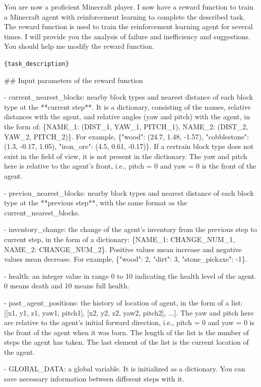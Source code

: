 

You are now a proficient Minecraft player. I now have a reward function to train a Minecraft agent with reinforcement learning to complete the described task. The reward function is used to train the reinforcement learning agent for several times. I will provide you the analysis of failure and inefficiency and suggestions. You should help me modify the reward function.



\texttt{\{task\_description\}}



\#\# Input parameters of the reward function

- current\_nearest\_blocks: nearby block types and nearest distance of each block type at the **current step**. It is a dictionary, consisting of the names, relative distances with the agent, and relative angles (yaw and pitch) with the agent, in the form of: \{NAME\_1: (DIST\_1, YAW\_1, PITCH\_1), NAME\_2: (DIST\_2, YAW\_2, PITCH\_2)\}. For example, \{"wood": (24.7, 1.48, -1.57), "cobblestone": (1.3, -0.17, 1.05), "iron\_ore": (4.5, 0.61, -0.17)\}. If a certrain block type does not exist in the field of view, it is not present in the dictionary. The yaw and pitch here is relative to the agent's front, i.e., pitch = 0 and yaw = 0 is the front of the agent.

- previou\_nearest\_blocks: nearby block types and nearest distance of each block type at the **previous step**, with the same format as the current\_nearest\_blocks.

- inventory\_change: the change of the agent's inventory from the previous step to current step, in the form of a dictionary: \{NAME\_1: CHANGE\_NUM\_1, NAME\_2: CHANGE\_NUM\_2\}. Positive values mean increase and negative values mean decrease. For example, \{"wood": 2, "dirt": 3, "stone\_pickaxe": -1\}.

- health: an integer value in range 0 to 10 indicating the health level of the agent. 0 means death and 10 means full health.

- past\_agent\_positions: the history of location of agent, in the form of a list: [[x1, y1, z1, yaw1, pitch1], [x2, y2, z2, yaw2, pitch2], ...]. The yaw and pitch here are relative to the agent's initial forward direction, i.e., pitch = 0 and yaw = 0 is the front of the agent when it was born. The length of the list is the number of steps the agent has taken. The last element of the list is the current location of the agent.

- GLOBAL\_DATA: a global variable. It is initialized as a dictionary. You can save necessary information between different steps with it.





